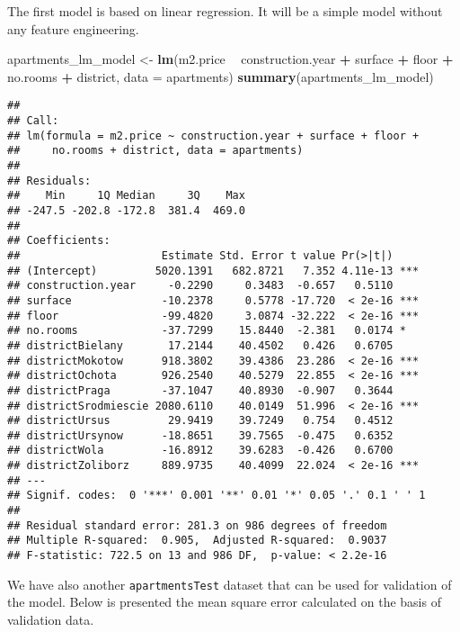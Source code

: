 \documentclass[]{book}
\newenvironment{Shaded}{\begin{snugshade}}{\end{snugshade}}
\newcommand{\DataTypeTok}[1]{\textcolor[rgb]{0.13,0.29,0.53}{#1}}
\newcommand{\KeywordTok}[1]{\textcolor[rgb]{0.13,0.29,0.53}{\textbf{#1}}}
\newcommand{\NormalTok}[1]{#1}
\newcommand{\OperatorTok}[1]{\textcolor[rgb]{0.81,0.36,0.00}{\textbf{#1}}}
\newcommand{\StringTok}[1]{\textcolor[rgb]{0.31,0.60,0.02}{#1}}
\theoremstyle{definition}
\theoremstyle{definition}
\theoremstyle{definition}
\theoremstyle{remark}
\begin{document}
The first model is based on linear regression. It will be a simple model
without any feature engineering.

\begin{Shaded}
\begin{Highlighting}[]
\NormalTok{apartments_lm_model <-}\StringTok{ }\KeywordTok{lm}\NormalTok{(m2.price }\OperatorTok{~}\StringTok{ }\NormalTok{construction.year }\OperatorTok{+}\StringTok{ }\NormalTok{surface }\OperatorTok{+}\StringTok{ }\NormalTok{floor }\OperatorTok{+}\StringTok{ }
\StringTok{                         }\NormalTok{no.rooms }\OperatorTok{+}\StringTok{ }\NormalTok{district, }\DataTypeTok{data =}\NormalTok{ apartments)}
\KeywordTok{summary}\NormalTok{(apartments_lm_model)}
\end{Highlighting}
\end{Shaded}

\begin{verbatim}
## 
## Call:
## lm(formula = m2.price ~ construction.year + surface + floor + 
##     no.rooms + district, data = apartments)
## 
## Residuals:
##    Min     1Q Median     3Q    Max 
## -247.5 -202.8 -172.8  381.4  469.0 
## 
## Coefficients:
##                      Estimate Std. Error t value Pr(>|t|)    
## (Intercept)         5020.1391   682.8721   7.352 4.11e-13 ***
## construction.year     -0.2290     0.3483  -0.657   0.5110    
## surface              -10.2378     0.5778 -17.720  < 2e-16 ***
## floor                -99.4820     3.0874 -32.222  < 2e-16 ***
## no.rooms             -37.7299    15.8440  -2.381   0.0174 *  
## districtBielany       17.2144    40.4502   0.426   0.6705    
## districtMokotow      918.3802    39.4386  23.286  < 2e-16 ***
## districtOchota       926.2540    40.5279  22.855  < 2e-16 ***
## districtPraga        -37.1047    40.8930  -0.907   0.3644    
## districtSrodmiescie 2080.6110    40.0149  51.996  < 2e-16 ***
## districtUrsus         29.9419    39.7249   0.754   0.4512    
## districtUrsynow      -18.8651    39.7565  -0.475   0.6352    
## districtWola         -16.8912    39.6283  -0.426   0.6700    
## districtZoliborz     889.9735    40.4099  22.024  < 2e-16 ***
## ---
## Signif. codes:  0 '***' 0.001 '**' 0.01 '*' 0.05 '.' 0.1 ' ' 1
## 
## Residual standard error: 281.3 on 986 degrees of freedom
## Multiple R-squared:  0.905,  Adjusted R-squared:  0.9037 
## F-statistic: 722.5 on 13 and 986 DF,  p-value: < 2.2e-16
\end{verbatim}

We have also another \texttt{apartmentsTest} dataset that can be used
for validation of the model. Below is presented the mean square error
calculated on the basis of validation data.
\end{document}
